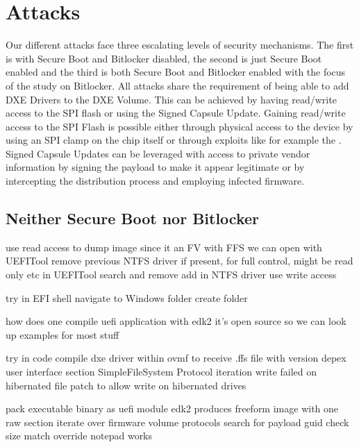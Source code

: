
\chapter{Attacks}

Our different attacks face three escalating levels of security mechanisms. The first is with Secure Boot and Bitlocker disabled, the second is just Secure Boot enabled and the third is both Secure Boot and Bitlocker enabled with the focus of the study on Bitlocker.
All attacks share the requirement of being able to add DXE Drivers to the DXE Volume.
This can be achieved by having read/write access to the SPI flash or using the Signed Capsule Update. Gaining read/write access to the SPI Flash is possible either through physical access to the device by using an SPI clamp on the chip itself or through exploits like for example the
. Signed Capsule Updates can be leveraged with access to private vendor information by signing the payload to make it appear legitimate or by intercepting the distribution process and employing infected firmware.




\section{Neither Secure Boot nor Bitlocker}
use read access to dump image
since it an FV with FFS we can open with UEFITool
remove previous NTFS driver if present, for full control, might be read only etc
in UEFITool search and remove
add in NTFS driver
use write access

try in EFI shell
navigate to Windows folder
create folder

how does one compile uefi application with edk2
it's open source so we can look up examples for most stuff

try in code
compile dxe driver within ovmf to receive .ffs file with version depex user interface section
SimpleFileSystem Protocol iteration
write failed on hibernated file
patch to allow write on hibernated drives

pack executable binary as uefi module
edk2 produces freeform image with one raw section
iterate over firmware volume protocols
search for payload guid
check size match
override notepad works


